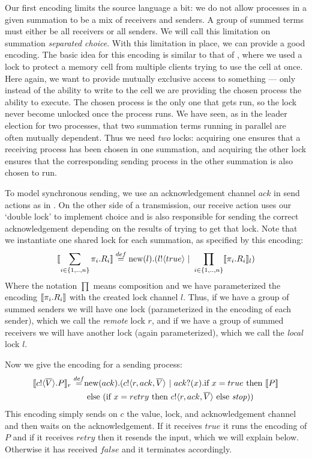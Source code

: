 Our first encoding limits the source language a bit: we do not allow processes in a given summation to be a mix of receivers and senders.  A group of summed terms must either be all receivers or all senders.  We will call this limitation on summation \emph{separated choice}.  With this limitation in place, we can provide a good encoding.  The basic idea for this encoding is similar to that of , where we used a lock to protect a memory cell from multiple clients trying to use the cell at once.  Here again, we want to provide mutually exclusive access to something --- only instead of the ability to write to the cell we are providing the chosen process the ability to execute.  The chosen process is the only one that gets run, so the lock never become unlocked once the process runs.  We have seen, as in the leader election for two processes, that two summation terms running in parallel are often mutually dependent.  Thus we need \emph{two} locks: acquiring one ensures that a receiving process has been chosen in one summation, and acquiring the other lock ensures that the corresponding sending process in the other summation is also chosen to run.

To model synchronous sending, we use an acknowledgement channel $ack$ in send actions as in .  On the other side of a transmission, our receive action uses our `double lock' to implement choice and is also responsible for sending the correct acknowledgement depending on the results of trying to get that lock.  Note that we instantiate one shared lock for each summation, as specified by this encoding:
\[
	\llbracket{\displaystyle\sum_{i\in \{1,..,n\}} \pi_i.R_i}\rrbracket \overset{\tiny{def}}{=} \text{new}({l}).({l}!\langle{true}\rangle \ |\  \displaystyle\prod_{i\in \{1,..,n\}}\llbracket{\pi_i.R_i}\rrbracket_l)
\]
Where the notation $\prod$ means composition and we have parameterized the encoding $\llbracket{\pi_i.R_i}\rrbracket$ with the created lock channel $l$.  Thus, if we have a group of summed senders we will have one lock (parameterized in the encoding of each sender), which we call the \emph{remote} lock $r$, and if we have a group of summed receivers we will have another lock (again parameterized), which we call the \emph{local} lock $l$.

Now we give the encoding for a sending process:
\begin{equation*}\begin{split}
	\llbracket{ \ensuremath{{c}!\langle{ \ensuremath{\overline{V}} }\rangle.} P}\rrbracket_r \overset{\tiny{def}}{=} & \text{new}({ack}).({c}!\langle{r,ack, \ensuremath{\overline{V}} }\rangle \ |\  {ack}?({x}). \text{if } {x=true} \text{ then } \llbracket{P}\rrbracket \\
	&\text{ else } (\text{if } {x=retry} \text{ then } {c}!\langle{r,ack, \ensuremath{\overline{V}} }\rangle \text{ else } \mbox{\emph{stop}}))
\end{split}\end{equation*}
This encoding simply sends on $c$ the value, lock, and acknowledgement channel and then waits on the acknowledgement.  If it receives $true$ it runs the encoding of $P$ and if it receives $retry$ then it resends the input, which we will explain below.  Otherwise it has received $false$ and it terminates accordingly.

